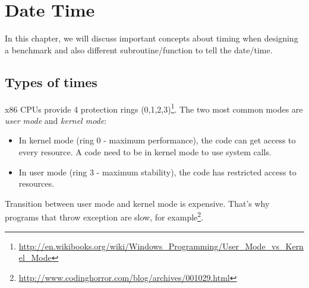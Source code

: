 
\chapter{Date Time}
\label{chap:date-time}


In this chapter, we will discuss important concepts about timing when
designing a benchmark and also different subroutine/function to tell
the date/time. 


\section{Types of times}
\label{sec:types-times}


x86 CPUs provide 4 protection rings
(0,1,2,3)\footnote{\url{http://en.wikibooks.org/wiki/Windows_Programming/User_Mode_vs_Kernel_Mode}}.
The two most common modes are {\it user mode} and {\it kernel mode}:
\begin{itemize}
\item In kernel mode (ring 0 - maximum performance), the code can get
  access to every resource. A code need to be in kernel mode to use
  system calls.
\item In user mode (ring 3 - maximum stability), the code has
  restricted access to resources.
\end{itemize}
Transition between user mode and kernel mode is expensive. That's why
programs that throw exception are slow, for
example\footnote{\url{http://www.codinghorror.com/blog/archives/001029.html}}.

